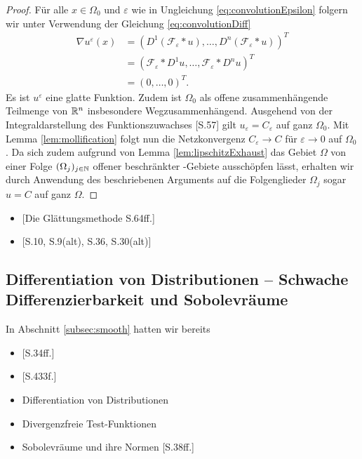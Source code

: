 \begin{proof}
  Für alle $x \in \Omega_0$ und $\varepsilon$ wie in Ungleichung \ref{eq:convolutionEpsilon} folgern wir unter Verwendung der Gleichung \ref{eq:convolutionDiff}
  \begin{align*}
    \nabla u^\varepsilon(x)
    &= (D^1 (\mathcal{F}_\varepsilon \ast u), \dots, D^n (\mathcal{F}_\varepsilon \ast u))^T \\
    &= ( \mathcal{F}_\varepsilon \ast D^1 u, \dots, \mathcal{F}_\varepsilon \ast D^n u)^T \\
    &= (0, \dots, 0)^T.
  \end{align*}
  Es ist $u^\varepsilon$ eine glatte Funktion.
  Zudem ist $\Omega_0$ als offene zusammenhängende Teilmenge von $\mathbb{R}^n$ insbesondere Wegzusammenhängend.
  Ausgehend von der Integraldarstellung des Funktionszuwachses \cite{koenigsberger2004ana2}[S.57] gilt $u_\varepsilon = C_\varepsilon$ auf ganz $\Omega_0$.
  Mit Lemma \ref{lem:mollification} folgt nun die Netzkonvergenz $C_\varepsilon \to C$ für $\varepsilon \to 0$ auf $\Omega_0$.
  Da sich zudem aufgrund von Lemma \ref{lem:lipschitzExhaust} das Gebiet $\Omega$ von einer Folge $(\Omega_j)_{j \in \mathbb{N}}$ offener beschränkter \lipschitz\hyp{}Gebiete ausschöpfen lässt, erhalten wir durch Anwendung des beschriebenen Arguments auf die Folgenglieder $\Omega_j$ sogar $u = C$ auf ganz $\Omega$.
\end{proof}

\begin{itemize}
  \item \cite{sohr2001navier}[Die Glättungsmethode S.64ff.]
  \item \cite{adams2003sobolev}[S.10, S.9(alt), S.36, S.30(alt)]
\end{itemize}

\subsection{Differentiation von Distributionen -- Schwache Differenzierbarkeit und Sobolevräume}
\label{subsec:distributionsSobolev}

In Abschnitt \ref{subsec:smooth} hatten wir bereits

\begin{itemize}
  \item \cite{sohr2001navier}[S.34ff.]
  \item \cite{werner2011fa}[S.433f.]
  \item Differentiation von Distributionen
  \item Divergenzfreie Test-Funktionen
  \item Sobolevräume und ihre Normen \cite{sohr2001navier}[S.38ff.]
\end{itemize}

